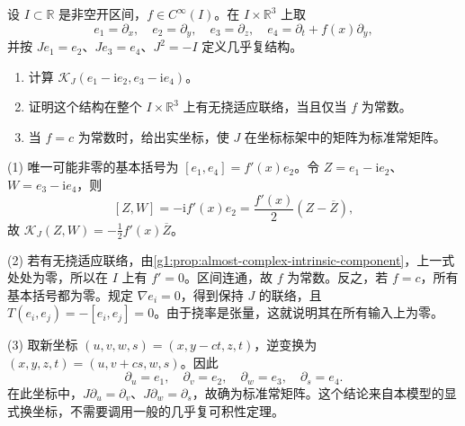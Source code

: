 \begin{exercise}
	\label{g1:ex:almost-complex-variable-obstruction}
	设 \(I\subset\mathbb R\) 是非空开区间，\(f\in C^\infty(I)\)。在 \(I\times\mathbb R^3\) 上取
	\[
		e_1=\partial_x,\quad e_2=\partial_y,\quad
		e_3=\partial_z,\quad e_4=\partial_t+f(x)\partial_y,
	\]
	并按 \(Je_1=e_2\)、\(Je_3=e_4\)、\(J^2=-I\) 定义几乎复结构。
	\begin{enumerate}
		\item 计算 \(\mathcal K_J(e_1-\mathrm i e_2,e_3-\mathrm i e_4)\)。
		\item 证明这个结构在整个 \(I\times\mathbb R^3\) 上有无挠适应联络，当且仅当 \(f\) 为常数。
		\item 当 \(f=c\) 为常数时，给出实坐标，使 \(J\) 在坐标标架中的矩阵为标准常矩阵。
	\end{enumerate}
\end{exercise}
\begin{solution}
	(1) 唯一可能非零的基本括号为 \([e_1,e_4]=f'(x)e_2\)。令 \(Z=e_1-\mathrm i e_2\)、\(W=e_3-\mathrm i e_4\)，则
	\[
		[Z,W]=-\mathrm i f'(x)e_2
		=\frac{f'(x)}2(Z-\overline Z),
	\]
	故 \(\mathcal K_J(Z,W)=-\tfrac12 f'(x)\overline Z\)。

	(2) 若有无挠适应联络，由\cref{g1:prop:almost-complex-intrinsic-component}，上一式处处为零，所以在 \(I\) 上有 \(f'=0\)。区间连通，故 \(f\) 为常数。反之，若 \(f=c\)，所有基本括号都为零。规定 \(\nabla e_i=0\)，得到保持 \(J\) 的联络，且 \(T(e_i,e_j)=-[e_i,e_j]=0\)。由于挠率是张量，这就说明其在所有输入上为零。

	(3) 取新坐标 \((u,v,w,s)=(x,y-ct,z,t)\)，逆变换为 \((x,y,z,t)=(u,v+cs,w,s)\)。因此
	\[
		\partial_u=e_1,\quad \partial_v=e_2,\quad
		\partial_w=e_3,\quad \partial_s=e_4.
	\]
	在此坐标中，\(J\partial_u=\partial_v\)、\(J\partial_w=\partial_s\)，故确为标准常矩阵。这个结论来自本模型的显式换坐标，不需要调用一般的几乎复可积性定理。
\end{solution}


